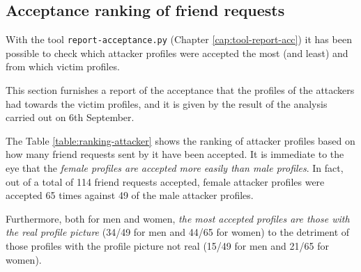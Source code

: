 \subsection{Acceptance ranking of friend requests}
\label{cap:acceptance-ranking}
With the tool \texttt{report-acceptance.py} (Chapter \ref{cap:tool-report-acc}) it has been possible to check which attacker profiles were accepted the most (and least) and from which victim profiles.
\par \noindent This section furnishes a report of the acceptance that the profiles of the attackers had towards the victim profiles, and it is given by the result of the analysis carried out on 6th September.\par \noindent  The Table \ref{table:ranking-attacker} shows the ranking of attacker profiles based on how many friend requests sent by it have been accepted. It is immediate to the eye that the \textit{female profiles are accepted more easily than male profiles}. In fact, out of a total of 114 friend requests accepted, female attacker profiles were accepted 65 times against 49 of the male attacker profiles.\par \noindent  Furthermore, both for men and women, \textit{the most accepted profiles are those with the real profile picture} (34/49 for men and 44/65 for women) to the detriment of those profiles with the profile picture not real (15/49 for men and 21/65 for women).

